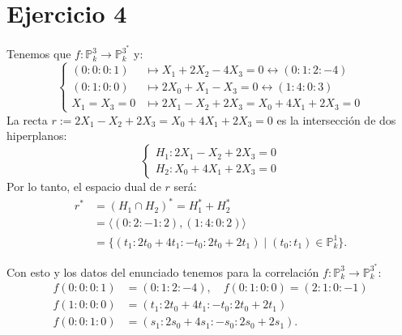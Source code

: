 \documentclass[10pt,a4paper,openright]{book}
\theoremstyle{break}
\begin{document}
\section{Ejercicio 4}%
\label{sec:ejercicio_4_4}
Tenemos que $f: \mathbb{P}^{3}_{k} \rightarrow \mathbb{P}^{3^*}_{k}$ y:
\[
\begin{cases}
    \left( 0 : 0 : 0 : 1 \right) &\mapsto X_1 + 2X_2 - 4X_3 = 0 \leftrightarrow \left( 0 : 1 : 2 : -4 \right) \\
    \left( 0 : 1 : 0 : 0 \right) &\mapsto 2X_0 + X_1 - X_3 = 0 \leftrightarrow \left( 1 : 4 : 0 : 3 \right)\\
    X_1 = X_3 = 0 &\mapsto 2X_1 - X_2 + 2X_3 = X_0 + 4X_1 + 2X_3 = 0 
\end{cases} 
\]
La recta $r := 2X_1 - X_2 + 2X_3 = X_0 + 4X_1 + 2X_3 = 0$ es la intersección de dos hiperplanos:
\[
\begin{cases}
    H_1 : 2X_1 - X_2 + 2X_3 = 0\\
    H_2 : X_0 + 4X_1 + 2X_3 = 0
\end{cases} 
\]
Por lo tanto, el espacio dual de $r$ será:
\begin{align*}
    r^* &= \left( H_1 \cap H_2 \right)^* = H_1^* + H_2^*\\
       &= \langle \left( 0 : 2 : -1 : 2 \right), \left( 1 : 4 : 0 : 2 \right) \rangle\\
       &= \{\left( t_1 : 2t_0 + 4t_1 : -t_0 : 2t_0 + 2t_1 \right) \mid \left( t_0 : t_1 \right) \in \mathbb{P}^{1}_{k}\} 
.\end{align*}

Con esto y los datos del enunciado tenemos para la correlación $f: \mathbb{P}^{3}_{k} \rightarrow \mathbb{P}^{3^*}_{k}$:
\begin{align*}
    f\left( 0 : 0 : 0 : 1 \right) &= \left( 0 : 1 : 2 : -4 \right),\quad f\left( 0 : 1 : 0 : 0 \right) = \left( 2 : 1 : 0 : -1 \right)\\
    f\left( 1 : 0 : 0 : 0 \right) &= \left( t_1 : 2t_0 + 4t_1 : -t_0 : 2t_0 + 2t_1 \right)\\
    f\left( 0 : 0 : 1 : 0 \right) &= \left( s_1 : 2s_0 + 4s_1 : -s_0 : 2s_0 + 2s_1 \right) 
.\end{align*}
\end{document}
